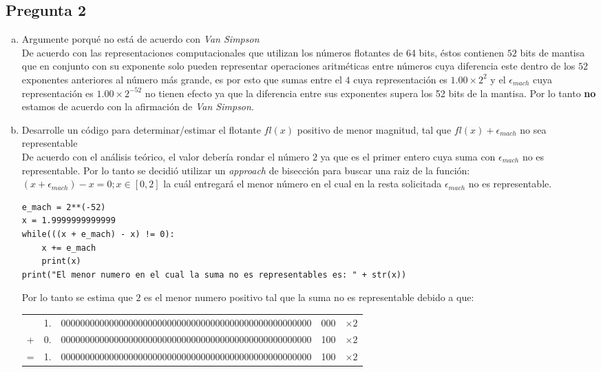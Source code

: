 \documentclass[10pt]{article}
\begin{document}
\subsection{Pregunta 2}
\begin{enumerate}[a)]
\item Argumente porqué no está de acuerdo con \textit{Van Simpson} \\
De acuerdo con las representaciones computacionales que utilizan los números flotantes de 64 bits, éstos contienen $52$ bits de mantisa que en conjunto con su exponente solo pueden representar operaciones aritméticas entre números cuya diferencia este dentro de los $52$ exponentes anteriores al número más grande, es por esto que sumas entre el $4$ cuya representación es $1.00 \times 2^{2}$ y el $\epsilon_{mach}$ cuya representación es $1.00 \times 2^{-52}$ no tienen efecto ya que la diferencia entre sus exponentes supera los 52 bits de la mantisa. Por lo tanto \textbf{no} estamos de acuerdo con la afirmación de \textit{Van Simpson}.

\item Desarrolle un código para determinar/estimar el flotante $fl(x)$ positivo de menor magnitud, tal que $fl(x) + \epsilon_{mach}$ no sea representable\\
De acuerdo con el análisis teórico, el valor debería rondar el número $2$ ya que es el primer entero cuya suma con $\epsilon_{mach}$ no es representable. Por lo tanto se decidió utilizar un \textit{approach} de bisección para buscar una raiz de la función: $(x + \epsilon_{mach}) - x = 0 ; x \in [0, 2]$ la cuál entregará el menor número en el cual en la resta solicitada $\epsilon_{mach}$ no es representable.
\begin{verbatim}
e_mach = 2**(-52)
x = 1.9999999999999
while(((x + e_mach) - x) != 0):
	x += e_mach
	print(x)
print("El menor numero en el cual la suma no es representables es: " + str(x))
\end{verbatim}
Por lo tanto se estima que $2$ es el menor numero positivo tal que la suma no es representable debido a que:
\begin{center}
\begin{tabular}{c c | c | c | c}
 \cline{3-4}
 & 1. & 0000000000000000000000000000000000000000000000000000 & 000 & $\times 2$\\
 \cline{3-4}
 + & 0. & 0000000000000000000000000000000000000000000000000000 & 100 & $\times 2$\\
 \cline{1-5}
 = & 1. & 0000000000000000000000000000000000000000000000000000 & 100 & $\times 2$\\
 \cline{3-4}
\end{tabular}
\end{center}


\end{enumerate}
\end{document}
